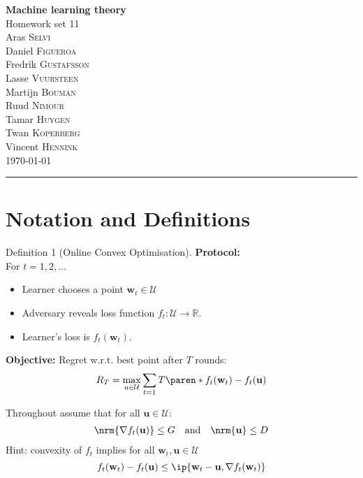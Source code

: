 \documentclass[10pt, a4paper, twoside]{amsart}
\theoremstyle{plain}
\newcommand{\R}{\ensuremath{\mathbb{R}}}
\DeclarePairedDelimiter\paren()
\DeclarePairedDelimiter{\ip}\langle\rangle
\DeclarePairedDelimiter{\nrm}\lVert\rVert
\newcommand{\cU}{\ensuremath{\mathcal{U}}}
\newcommand{\bw}{\ensuremath{\mathbf{w}}} %
\newcommand{\bu}{\ensuremath{\mathbf{u}}} %
\begin{document}
\begin{center}
    {\huge\bf Machine learning theory}\\
    {\large\sc Homework set 11 }\\ \vspace{1em}
    {Aras} \textsc{ {Selvi}} \\
    {Daniel} \textsc{ {Figueroa}}\\
    {Fredrik} \textsc{ {Gustafsson}}\\
    {Lasse} \textsc{ {Vuursteen}}\\
    {Martijn} \textsc{ {Bouman}}\\
    {Ruud} \textsc{ {Nimour}}\\
    {Tamar} \textsc{ {Huygen}}\\
    {Twan} \textsc{ {Koperberg}}\\
    {Vincent} \textsc{ {Hennink}}\\ 
    \bigskip
    \today \bigskip
    \hrule
    \bigskip
\end{center}

\section{Notation and Definitions}
\begin{definitionbox}{Definition 1 (Online Convex Optimisation).}
  \textbf{Protocol:}\\
  For $t = 1,2, \ldots$
  \begin{itemize}
    \item Learner chooses a point $\bw_t \in \cU$
    \item Adversary reveals loss function $f_t : \cU \to \R $.
    \item Learner's loss is $f_{t}(\bw_t)$.
  \end{itemize}
  \textbf{Objective:} Regret w.r.t. best point after $T$ rounds:
\begin{equation*}
  R_T = \max_{u \in \cU}\sum_{t=1}T \paren*{f_t(\bw_t) - f_t(\bu)}
\end{equation*}
\end{definitionbox}
Throughout assume that for all $\bu \in \cU$:
\begin{align*}
  \nrm{\nabla f_t(\bu)} \leq G && \mbox{and} && \nrm{\bu}\leq D
\end{align*}
Hint: convexity of $f_t$ implies for all $\bw_t , \bu \in \cU$
\begin{equation*}
  f_t(\bw_t) - f_t (\bu) \leq \ip{\bw_t - \bu, \nabla f_t(\bw_t)} %
\end{equation*}
\end{document}

